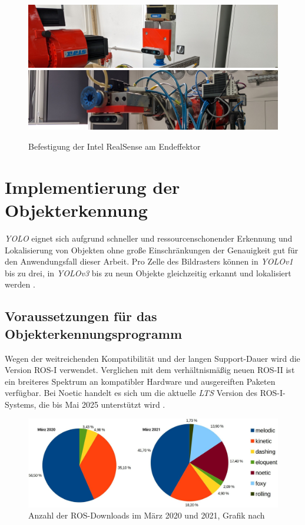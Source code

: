 \begin{figure}[ht]
    \centering
    \includegraphics[width=\textwidth]{Bilder/realsense_halter.jpg}
    \includegraphics[width=\textwidth]{Bilder/realsense_halter2.jpg}
    \caption{Befestigung der Intel RealSense am Endeffektor}
    \label{fig:realsense_halter}
\end{figure}

\section{Implementierung der Objekterkennung}

\textit{\ac{YOLO}} eignet sich aufgrund schneller und ressourcenschonender Erkennung und Lokalisierung von Objekten ohne große Einschränkungen der Genauigkeit gut für den Anwendungsfall dieser Arbeit. Pro Zelle des Bildrasters können in \textit{YOLOv1} bis zu drei, in \textit{YOLOv3} bis zu neun Objekte gleichzeitig erkannt und lokalisiert werden \cite{bandyopadhyay_yolo_2021}. 

\subsection{Voraussetzungen für das Objekterkennungsprogramm}

Wegen der weitreichenden Kompatibilität und der langen Support-Dauer wird die Version \ac{ROS}-I verwendet. Verglichen mit dem verhältnismäßig neuen \ac{ROS}-II ist ein breiteres Spektrum an kompatibler Hardware und ausgereiften Paketen verfügbar. Bei Noetic handelt es sich um die aktuelle \textit{\ac{LTS}} Version des \ac{ROS}-I-Systems, die bis Mai 2025 unterstützt wird \cite[Abschnitt~3]{miura_distributions_2021}.

\begin{figure}[ht]
    \centering
    \includegraphics[width=\textwidth]{Bilder/ros_distro_usage.jpg}
    \caption{Anzahl der ROS-Downloads im März 2020 und 2021, Grafik nach \cite{scott_ros_2021}}
    \label{fig:ros_distro_usage}
\end{figure}

